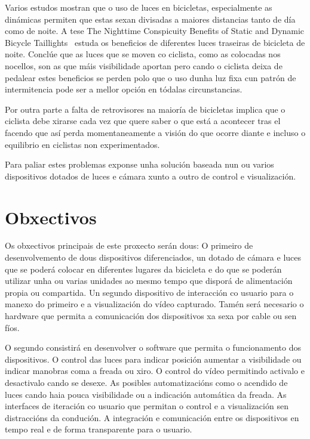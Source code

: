 Varios estudos mostran que o uso de luces en bicicletas, especialmente as dinámicas permiten que estas sexan divisadas a maiores distancias tanto de día como de noite. A tese The Nighttime Conspicuity Benefits of Static and Dynamic Bicycle Taillights~\cite{edewaardNighttimeConspicuityBenefits2017} estuda os beneficios de diferentes luces traseiras de bicicleta de noite. Conclúe que as luces que se moven co ciclista, como as colocadas nos nocellos, son as que máis visibilidade aportan pero cando o ciclista  deixa de pedalear estes beneficios se perden polo que o uso dunha luz fixa cun patrón de intermitencia pode ser a mellor opción en tódalas circunstancias.

Por outra parte a falta de retrovisores na maioría de bicicletas implica que o ciclista debe xirarse cada vez que quere saber o que está a acontecer tras el facendo que así perda momentaneamente a visión do que ocorre diante e incluso o equilibrio en ciclistas non experimentados.

Para paliar estes problemas exponse unha solución baseada nun ou varios dispositivos dotados de luces e cámara xunto a outro de control e visualización.


\section{Obxectivos}
\label{sec:obxectivos}
Os obxectivos principais de este proxecto serán dous:
O primeiro de desenvolvemento de dous dispositivos diferenciados, un dotado de cámara e luces que se poderá colocar en diferentes lugares da bicicleta e do que se poderán utilizar unha ou varias unidades ao mesmo tempo que disporá de alimentación propia ou compartida. Un segundo dispositivo de interacción co usuario para o manexo do primeiro e a visualización do vídeo capturado. Tamén será necesario o hardware que permita a comunicación dos dispositivos xa sexa por cable ou sen fíos.

O segundo consistirá en desenvolver o software que permita o funcionamento dos dispositivos. O control das luces para indicar posición aumentar a visibilidade ou indicar manobras coma a freada ou xiro. O control do vídeo permitindo activalo e desactivalo cando se desexe. As posibles automatizacións como o acendido de luces cando haia pouca visibilidade ou a indicación automática da freada. As interfaces de iteración co usuario que permitan o control e a visualización sen distraccións da condución. A integración e comunicación entre os dispositivos en tempo real e de forma transparente para o usuario.

